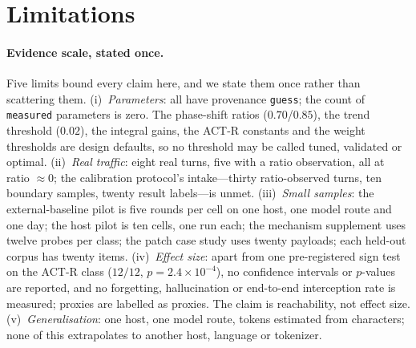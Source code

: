 
\section{Limitations}\label{sec:limitations}

\paragraph{Evidence scale, stated once.} Five limits bound every claim here, and
we state them once rather than scattering them. (i)~\emph{Parameters}: all have
provenance \texttt{guess}; the count of \texttt{measured} parameters is zero. The
phase-shift ratios ($0.70$/$0.85$), the trend threshold ($0.02$), the integral
gains, the ACT-R constants and the weight thresholds are design defaults, so no
threshold may be called tuned, validated or optimal. (ii)~\emph{Real traffic}:
eight real turns, five with a ratio observation, all at ratio $\approx 0$; the
calibration protocol's intake---thirty ratio-observed turns, ten boundary
samples, twenty result labels---is unmet. (iii)~\emph{Small samples}: the
external-baseline pilot is five rounds per cell on one host, one model route and
one day; the host pilot is ten cells, one run each; the mechanism supplement uses
twelve probes per class; the patch case study uses twenty payloads; each
held-out corpus has twenty items.
(iv)~\emph{Effect size}: apart from one pre-registered sign test on the ACT-R
class ($12/12$, $p=2.4\times10^{-4}$), no confidence intervals or $p$-values are
reported, and no forgetting, hallucination or end-to-end interception rate is
measured; proxies are labelled as proxies. The claim is reachability, not effect
size. (v)~\emph{Generalisation}: one host, one model route, tokens estimated from
characters; none of this extrapolates to another host, language or tokenizer.

